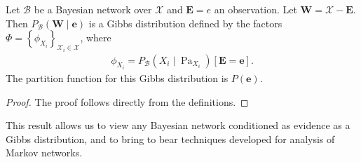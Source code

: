 \documentclass{article}
\begin{document}
\begin{lema}
 Let $\mathcal{B}$ be a Bayesian network over $\mathcal{X}$ and $\boldsymbol{E}=e$ an observation. Let $\boldsymbol{W}=\mathcal{X}-\boldsymbol{E}$. Then $P_{\mathcal{B}}(\boldsymbol{W} \mid \boldsymbol{e})$ is a Gibbs distribution defined by the factors $\Phi=\left\{\phi_{X_{i}}\right\}_{\mathcal{X}_{i} \in \mathcal{X}}$, where
\begin{align*}
\phi_{X_{i}}=P_{\mathcal{B}}\left(X_{i} \mid \operatorname{Pa}_{X_{i}}\right)[\boldsymbol{E}=\boldsymbol{e}] .
\end{align*}
The partition function for this Gibbs distribution is $P(\boldsymbol{e})$.
\end{lema}
\begin{proof}
The proof follows directly from the definitions.
\end{proof}
\begin{rema}
 This result allows us to view any Bayesian network conditioned as evidence as a Gibbs distribution, and to bring to bear techniques developed for analysis of Markov networks.
 \end{rema}
\end{document}
